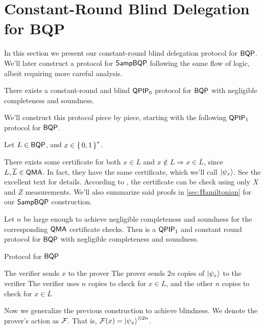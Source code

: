 \section{Constant-Round Blind Delegation for BQP}
\label{sec:BlindBQP}

In this section we present our constant-round blind delegation protocol for $\operatorname{\mathsf{BQP}}$.
We'll later construct a protocol for $\operatorname{\mathsf{SampBQP}}$ following the same flow of logic, albeit requiring more careful analysis.

\begin{thm}
	There exists a constant-round and blind $\operatorname{\mathsf{QPIP}}_0$ protocol for $\operatorname{\mathsf{BQP}}$ with negligible completeness and soundness.
\end{thm}

We'll construct this protocol piece by piece, starting with the following $\operatorname{\mathsf{QPIP}}_1$ protocol for $\operatorname{\mathsf{BQP}}$.

Let $L\in\operatorname{\mathsf{BQP}}$, and $x\in\set{0,1}^*$.

There exists some certificate for both $x\in L$ and $x\notin L\Rightarrow x\in\overline{L}$, since $L, \overline{L}\in\operatorname{\mathsf{QMA}}$.
In fact, they have the same certificate, which we'll call $\ket{\psi_x}$. See the excellent text \cite{kitaev2002classical} for details.
According to \cite{PhysRevA.93.022326}, the certificate can be check using only $X$ and $Z$ measurements.
We'll also summarize said proofs in \cref{sec:Hamiltonian} for our $\operatorname{\mathsf{SampBQP}}$ construction.

\begin{thm}
	Let $n$ be large enough to achieve negligible completeness and soundness for the corresponding $\operatorname{\mathsf{QMA}}$ certificate checks.
	Then  is a $\operatorname{\mathsf{QPIP}}_1$ and constant round protocol for $\operatorname{\mathsf{BQP}}$ with negligible completeness and soundness.
\end{thm}

\begin{algorithm}
	\caption{Protocol for $\operatorname{\mathsf{BQP}}$}
	\label{proto:BQP}
	\begin{algorithmic}[1]
		\State The verifier sends $x$ to the prover
		\State The prover sends $2n$ copies of $\ket{\psi_x}$ to the verifier
		\State The verifier uses $n$ copies to check for $x\in L$, and the other $n$ copies to check for $x\in\overline{L}$
	\end{algorithmic}
\end{algorithm}

Now we generalize the previous construction to achieve blindness.
We denote the prover's action as $\mathcal{F}$. That is, $\mathcal{F}(x)=\ket{\psi_x}^{\otimes 2n}$.

